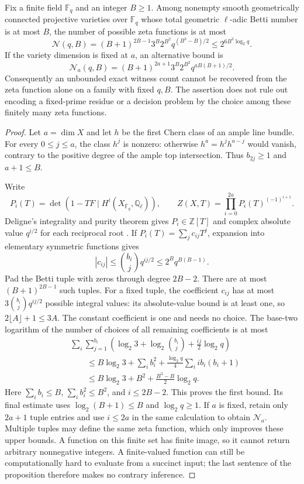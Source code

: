 \begin{proposition}\label{prop:ff-betti-finite}
Fix a finite field $\mathbb F_q$ and an integer $B\geq1$. Among nonempty smooth geometrically connected projective varieties over $\mathbb F_q$ whose total geometric $\ell$-adic Betti number is at most $B$, the number of possible zeta functions is at most
\[
 \mathcal N(q,B)=(B+1)^{2B-1}3^B2^{B^2}q^{(B^3-B)/2}
                 \leq 2^{6B^3\log_2q}.
\]
If the variety dimension is fixed at $a$, an alternative bound is
\[
 \mathcal N_a(q,B)=(B+1)^{2a+1}3^B2^{B^2}q^{aB(B+1)/2}.
\]
Consequently an unbounded exact witness count cannot be recovered from the zeta function alone on a family with fixed $q,B$. The assertion does not rule out encoding a fixed-prime residue or a decision problem by the choice among these finitely many zeta functions.
\end{proposition}
\begin{proof}
Let $a=\dim X$ and let $h$ be the first Chern class of an ample line bundle. For every $0\leq j\leq a$, the class $h^j$ is nonzero: otherwise $h^a=h^jh^{a-j}$ would vanish, contrary to the positive degree of the ample top intersection. Thus $b_{2j}\geq1$ and $a+1\leq B$.

Write
\[
 P_i(T)=\det(1-TF\mid H^i(X_{\overline{\mathbb F}_q},\mathbb Q_\ell)),
 \qquad Z(X,T)=\prod_{i=0}^{2a}P_i(T)^{(-1)^{i+1}}.
\]
Deligne's integrality and purity theorem gives $P_i\in\mathbb Z[T]$ and complex absolute value $q^{i/2}$ for each reciprocal root \cite[Theorem~1.6, p.~276]{ff-deligne}. If $P_i(T)=\sum_j c_{ij}T^j$, expansion into elementary symmetric functions gives
\[
 |c_{ij}|\leq\binom{b_i}{j}q^{ij/2}
          \leq 2^Bq^{B(B-1)}.
\]
Pad the Betti tuple with zeros through degree $2B-2$. There are at most $(B+1)^{2B-1}$ such tuples. For a fixed tuple, the coefficient $c_{ij}$ has at most $3\binom{b_i}{j}q^{ij/2}$ possible integral values: its absolute-value bound is at least one, so $2\lfloor A\rfloor+1\leq3A$. The constant coefficient is one and needs no choice. The base-two logarithm of the number of choices of all remaining coefficients is at most
\begin{align*}
 &\sum_i\sum_{j=1}^{b_i}
   \left(\log_2 3+\log_2\binom{b_i}{j}
                     +\frac{ij}{2}\log_2q\right)\\
 &\qquad\leq B\log_2 3+\sum_i b_i^2
             +\frac{\log_2q}{4}\sum_i i b_i(b_i+1)\\
 &\qquad\leq B\log_2 3+B^2+\frac{B^3-B}{2}\log_2q.
\end{align*}
Here $\sum_i b_i\leq B$, $\sum_i b_i^2\leq B^2$, and $i\leq2B-2$. This proves the first bound. Its final estimate uses $\log_2(B+1)\leq B$ and $\log_2q\geq1$. If $a$ is fixed, retain only $2a+1$ tuple entries and use $i\leq2a$ in the same calculation to obtain $\mathcal N_a$. Multiple tuples may define the same zeta function, which only improves these upper bounds. A function on this finite set has finite image, so it cannot return arbitrary nonnegative integers. A finite-valued function can still be computationally hard to evaluate from a succinct input; the last sentence of the proposition therefore makes no contrary inference.
\end{proof}

